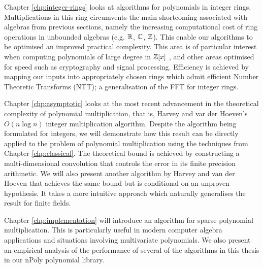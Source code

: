 Chapter \ref{chp:integer-rings} looks at algorithms for polynomials in integer rings. Multiplications in this ring circumvents the main shortcoming associated with algebras from previous sections, namely the increasing computational cost of ring operations in unbounded algebras (e.g. ${\mathbb R}$, ${\mathbb C}$, ${\mathbb Z}$). This enable our algorithms to be optimised an improved practical complexity. This area is of particular interest when computing polynomials of large degree in ${\mathbb Z}[x]$ \cite{crt-parallel-mul}\cite{crt-mul-gpu}, and other areas optimised for speed such as cryptography and signal processing. Efficiency is achieved by mapping our inputs into appropriately chosen rings which admit efficient Number Theoretic Transforms (NTT); a generalisation of the FFT for integer rings.

Chapter \ref{chp:asymptotic} looks at the most recent advancement in the theoretical complexity of polynomial multiplication, that is, Harvey and var der Hoeven's $O(n \log n)$ integer multiplication algorithm. Despite the algorithm \cite{nlogn} being formulated for integers, we will demonstrate how this result can be directly applied to the problem of polynomial multiplication using the techniques from Chapter \ref{chp:classical}. The theoretical bound is achieved by constructing a multi-dimensional convolution that controls the error in its finite precision arithmetic. We will also present another algorithm by Harvey and van der Hoeven that achieves the same bound but is conditional on an unproven hypothesis. It takes a more intuitive approach which naturally generalises the result for finite fields.

Chapter \ref{chp:implementation} will introduce an algorithm for sparse polynomial multiplication. This is particularly useful in modern computer algebra applications and situations involving multivariate polynomials. We also present an empirical analysis of the performance of several of the algorithms in this thesis in our nPoly polynomial library\cite{npoly}.
